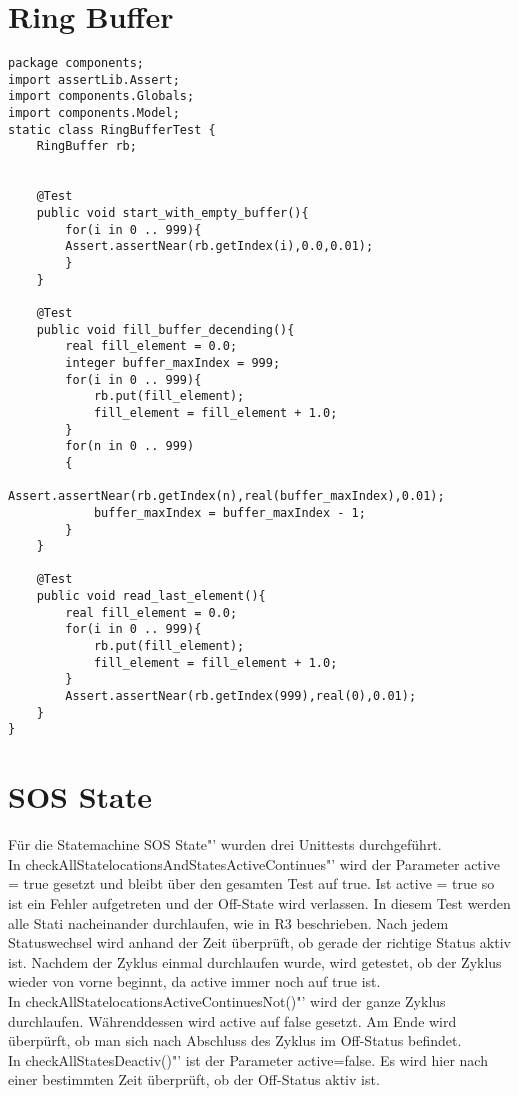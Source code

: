 \section{Ring Buffer}
\begin{lstlisting}
package components;
import assertLib.Assert;
import components.Globals;
import components.Model;
static class RingBufferTest {
	RingBuffer rb;
	
	
	@Test
	public void start_with_empty_buffer(){
		for(i in 0 .. 999){
		Assert.assertNear(rb.getIndex(i),0.0,0.01);
		}
	}
	
	@Test
	public void fill_buffer_decending(){
		real fill_element = 0.0;
		integer buffer_maxIndex = 999;
		for(i in 0 .. 999){
			rb.put(fill_element);
			fill_element = fill_element + 1.0;
		}
		for(n in 0 .. 999)
		{
			Assert.assertNear(rb.getIndex(n),real(buffer_maxIndex),0.01);
			buffer_maxIndex = buffer_maxIndex - 1;
		}
	}
	
	@Test
	public void read_last_element(){
		real fill_element = 0.0;
		for(i in 0 .. 999){
			rb.put(fill_element);
			fill_element = fill_element + 1.0;
		}
		Assert.assertNear(rb.getIndex(999),real(0),0.01);
	}
}
\end{lstlisting}

\section{SOS State}
Für die Statemachine \glqq SOS State"' wurden drei Unittests durchgeführt.\\
In \glqq checkAllStatelocationsAndStatesActiveContinues"' wird der Parameter active = true gesetzt und bleibt über den gesamten Test auf true. Ist active = true so ist ein Fehler aufgetreten und der Off-State wird verlassen. In diesem Test werden alle Stati nacheinander durchlaufen, wie in R3 beschrieben. Nach jedem Statuswechsel wird anhand der Zeit überprüft, ob gerade der richtige Status aktiv ist. Nachdem der Zyklus einmal durchlaufen wurde, wird getestet, ob der Zyklus wieder von vorne beginnt, da active immer noch auf true ist.\\
In \glqq checkAllStatelocationsActiveContinuesNot()"' wird der ganze Zyklus durchlaufen. Währenddessen wird active auf false gesetzt. Am Ende wird überpürft, ob man sich nach Abschluss des Zyklus im Off-Status befindet.\\
In \glqq checkAllStatesDeactiv()"' ist der Parameter active=false. Es wird hier nach einer bestimmten Zeit überprüft, ob der Off-Status aktiv ist.

